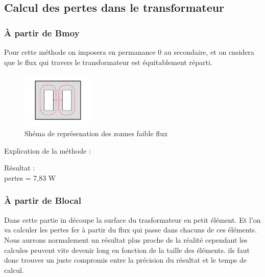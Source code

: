 
\subsection{Calcul des pertes dans le transformateur}

\subsubsection{À partir de Bmoy}

Pour cette méthode on imposera en permanance 0 au secondaire, et on cnsidera que le flux qui travers le transformateur est équitablement réparti. \\

\begin{figure}
	\begin{center}
	\includegraphics[width=0.3\textwidth]{images/TP3_repartission_Bmoy}
	\caption{Shéma de représenation des zonnes faible flux}\label{img:RepChampsBmoy}
	\end{center}
\end{figure}





Explication de la méthode : 

Résultat : \\
pertes = 7,83 W\\

\subsubsection{À partir de Blocal}
Dans cette partie in découpe la surface du trasformateur en petit élément. Et l'on va calculer les pertes fer à partir du flux qui passe dans chacuns de ces éléments. Nous aurrons normalement un résultat plus proche de la réalité cependant les calcules peuvent vite devenir long en fonction de la taille des éléments. ils faut donc trouver un juste compromis entre la précision du résultat et le temps de calcul. 


